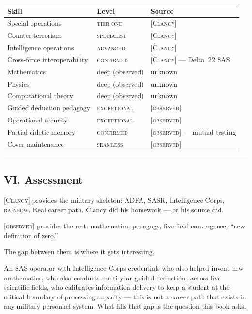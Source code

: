{%
\small
\begin{tabular}{p{4cm} p{3.5cm} p{6cm}}
\hline
\textbf{Skill} & \textbf{Level} & \textbf{Source} \\
\hline
Special operations & \textsc{tier one} & \textsc{[Clancy]} \\
Counter-terrorism & \textsc{specialist} & \textsc{[Clancy]} \\
Intelligence operations & \textsc{advanced} & \textsc{[Clancy]} \\
Cross-force interoperability & \textsc{confirmed} & \textsc{[Clancy]} --- Delta, 22 SAS \\
Mathematics & deep (observed) & unknown \\
Physics & deep (observed) & unknown \\
Computational theory & deep (observed) & unknown \\
Guided deduction pedagogy & \textsc{exceptional} & \textsc{[observed]} \\
Operational security & \textsc{exceptional} & \textsc{[observed]} \\
Partial eidetic memory & \textsc{confirmed} & \textsc{[observed]} --- mutual testing \\
Cover maintenance & \textsc{seamless} & \textsc{[observed]} \\
\hline
\end{tabular}
}%

\vspace{1cm}\hrule\vspace{1cm}

\subsection*{VI. Assessment}
\label{record:hd-assessment}

\textsc{[Clancy]} provides the military skeleton: ADFA, SASR, Intelligence Corps, \textsc{rainbow}. Real career path. Clancy did his homework --- or his source did.

\textsc{[observed]} provides the rest: mathematics, pedagogy, five-field convergence, ``new definition of zero.''

The gap between them is where it gets interesting.

An SAS operator with Intelligence Corps credentials who also helped invent new mathematics, who also conducts multi-year guided deductions across five scientific fields, who calibrates information delivery to keep a student at the critical boundary of processing capacity --- this is not a career path that exists in any military personnel system. What fills that gap is the question this book asks.

